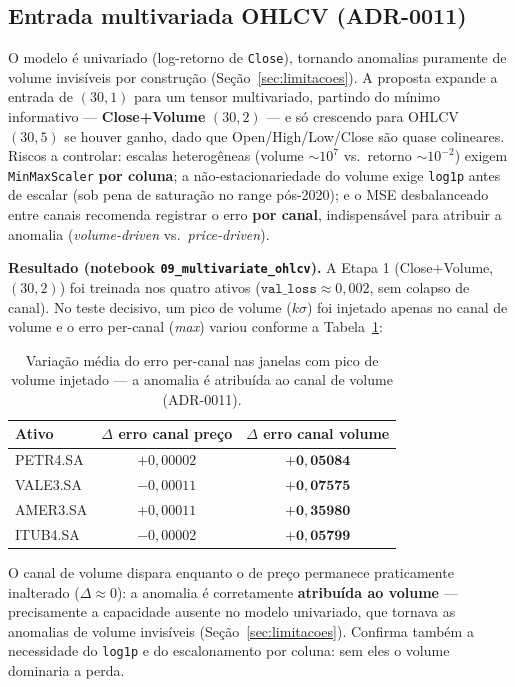 \subsection{Entrada multivariada OHLCV (ADR-0011)}
\label{sec:m8-multivariado}
O modelo é univariado (log-retorno de \texttt{Close}), tornando anomalias puramente de volume
invisíveis por construção (Seção~\ref{sec:limitacoes}). A proposta expande a entrada de
$(30,1)$ para um tensor multivariado, partindo do mínimo informativo --- \textbf{Close+Volume}
$(30,2)$ --- e só crescendo para OHLCV $(30,5)$ se houver ganho, dado que Open/High/Low/Close são
quase colineares. Riscos a controlar: escalas heterogêneas (volume $\sim 10^7$ vs.\ retorno
$\sim 10^{-2}$) exigem \texttt{MinMaxScaler} \textbf{por coluna}; a não-estacionariedade do volume
exige \texttt{log1p} antes de escalar (sob pena de saturação no range pós-2020); e o MSE
desbalanceado entre canais recomenda registrar o erro \textbf{por canal}, indispensável para
atribuir a anomalia (\emph{volume-driven} vs.\ \emph{price-driven}).

\par\noindent\textbf{Resultado (notebook \texttt{09\_multivariate\_ohlcv}).} A Etapa 1
(Close+Volume, $(30,2)$) foi treinada nos quatro ativos ($\texttt{val\_loss} \approx 0{,}002$,
sem colapso de canal). No teste decisivo, um pico de volume ($k\sigma$) foi injetado apenas no
canal de volume e o erro per-canal (\emph{max}) variou conforme a Tabela~\ref{tab:m8-multi}:

\begin{table}[h]
\centering
\caption{Variação média do erro per-canal nas janelas com pico de volume injetado --- a
anomalia é atribuída ao canal de volume (ADR-0011).}
\label{tab:m8-multi}
\begin{tabular}{lcc}
\toprule
\textbf{Ativo} & \textbf{$\Delta$ erro canal preço} & \textbf{$\Delta$ erro canal volume} \\
\midrule
PETR4.SA & $+0{,}00002$ & $\mathbf{+0{,}05084}$ \\
VALE3.SA & $-0{,}00011$ & $\mathbf{+0{,}07575}$ \\
AMER3.SA & $+0{,}00011$ & $\mathbf{+0{,}35980}$ \\
ITUB4.SA & $-0{,}00002$ & $\mathbf{+0{,}05799}$ \\
\bottomrule
\end{tabular}
\end{table}

\noindent O canal de volume dispara enquanto o de preço permanece praticamente inalterado
($\Delta \approx 0$): a anomalia é corretamente \textbf{atribuída ao volume} --- precisamente a
capacidade ausente no modelo univariado, que tornava as anomalias de volume invisíveis
(Seção~\ref{sec:limitacoes}). Confirma também a necessidade do \texttt{log1p} e do escalonamento
por coluna: sem eles o volume dominaria a perda.

